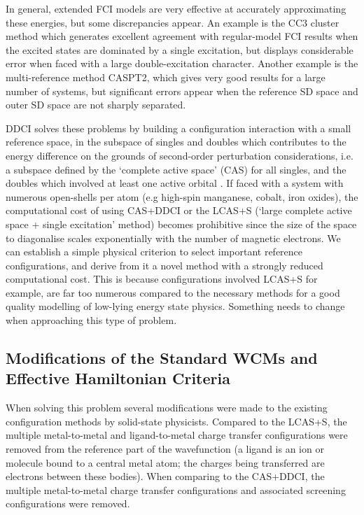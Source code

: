 \documentclass[10pt]{article}
\begin{document}
In general, extended FCI models are very effective at accurately approximating these energies, but some discrepancies appear. An example is the CC3 cluster method which generates excellent agreement with regular-model FCI results when the excited states are dominated by a single excitation, but displays considerable error when faced with a large double-excitation character. Another example is the multi-reference method CASPT2, which gives very good results for a large number of systems, but significant errors appear when the reference SD space and outer SD space are not sharply separated.

DDCI solves these problems by building a configuration interaction with a small reference space, in the subspace of singles and doubles which contributes to the energy difference on the grounds of second-order perturbation considerations, i.e. a subspace defined by the `complete active space' (CAS) for all singles, and the doubles which involved at least one active orbital \cite{garcia1997application}. If faced with a system with numerous open-shells per atom (e.g high-spin manganese, cobalt, iron oxides), the computational cost of using CAS+DDCI or the LCAS+S (`large complete active space + single excitation' method) becomes prohibitive since the size of the space to diagonalise scales exponentially with the number of magnetic electrons. We can establish a simple physical criterion to select important reference configurations, and derive from it a novel method with a strongly reduced computational cost. This is because configurations involved LCAS+S for example, are far too numerous compared to the necessary methods for a good quality modelling of low-lying energy state physics. Something needs to change when approaching this type of problem.

\subsection{Modifications of the Standard WCMs and Effective Hamiltonian Criteria}

When solving this problem several modifications were made to the existing configuration methods by solid-state physicists. Compared to the LCAS+S, the multiple metal-to-metal and ligand-to-metal charge transfer configurations were removed from the reference part of the wavefunction (a ligand is an ion or molecule bound to a central metal atom; the charges being transferred are electrons between these bodies). When comparing to the CAS+DDCI, the multiple metal-to-metal charge transfer configurations and associated screening configurations were removed.
\end{document}

